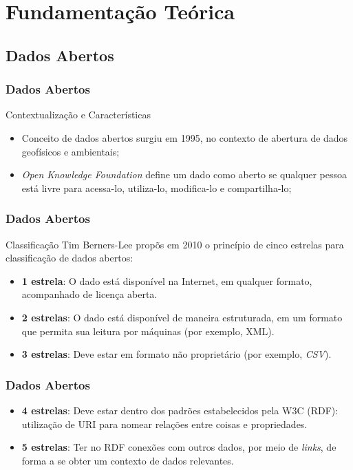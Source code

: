 \documentclass[brazil]{beamer}
\begin{document}
\section{Fundamentação Teórica}

\subsection{Dados Abertos}

\begin{frame}
	\frametitle{Dados Abertos}
	\begin{block}{Contextualização e Características}
		\begin{itemize}
			\item Conceito de dados abertos surgiu em 1995, no contexto de abertura de dados geofísicos e ambientais;
			\item \emph{Open Knowledge Foundation} define um dado como aberto se qualquer pessoa está livre para acessa-lo, utiliza-lo, modifica-lo e compartilha-lo;
		\end{itemize}
	\end{block}
\end{frame}
	
\begin{frame}
	\frametitle{Dados Abertos}

	\begin{block}{Classificação}
		Tim Berners-Lee propõs em 2010 o princípio de cinco estrelas para classificação de dados abertos:
		\begin{itemize}
			\item \textbf{1 estrela}: O dado está disponível na Internet, em qualquer formato, acompanhado de licença aberta.
			\item \textbf{2 estrelas}: O dado está disponível de maneira estruturada, em um formato que permita sua leitura por máquinas (por exemplo, XML).
			\item \textbf{3 estrelas}: Deve estar em formato não proprietário (por exemplo, \emph{CSV}).
		\end{itemize}
	\end{block}
\end{frame}

\begin{frame}
	\frametitle{Dados Abertos}
	
	\begin{itemize}
		\item \textbf{4 estrelas}: Deve estar dentro dos padrões estabelecidos pela W3C (RDF): utilização de URI para nomear relações entre coisas e propriedades.
		\item \textbf{5 estrelas}: Ter no RDF conexões com outros dados, por meio de \emph{links}, de forma a se obter um contexto de dados relevantes.
	\end{itemize}
\end{frame}
\end{document}
